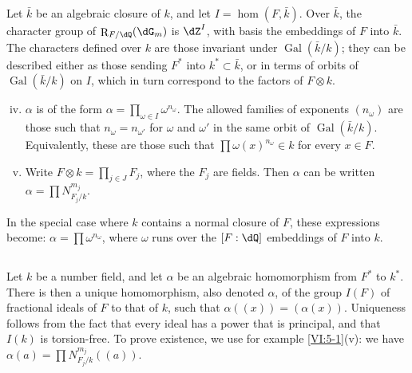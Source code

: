 \documentclass[oneside]{book}
\DeclareMathOperator{\gal}{Gal}
\DeclareMathOperator{\res}{R} %
\newcounter{char}
\theoremstyle{sga-source}
\theoremstyle{sga-source-dash}
\theoremstyle{sga-source-dotdash}
\theoremstyle{sga-source-number-note-dash}
\theoremstyle{sga-source-note-number-dotdash}
\theoremstyle{sga-source-example-dotdash}
\theoremstyle{sga-source-inline-number}
\theoremstyle{sga-source-bare-number}
\theoremstyle{sga-source}
\newcommand{\PrintPage}[1]{}\newcommand{\MathPage}[1]{}\newcommand{\PrintCite}[2]{#1}\newcommand{\var}[3]{#2}
\begin{document}
Let $\bar k$ be an algebraic closure of $k$, and let $I=\hom(F,\bar k)$. Over 
$\bar k$, the character group of $\res_{F/\dQ}(\dG_m)$ is $\dZ^I$, with basis 
the embeddings of $F$ into $\bar k$. The characters defined over $k$ 
are those invariant under $\gal(\bar k/k)$; they can be described either as 
those sending $F^\ast$ into $k^\ast\subset \bar k$, or in terms of 
orbits of $\gal(\bar k/k)$ on $I$, which in turn correspond to the factors of 
$F\otimes k$. 
\begin{enumerate}[(i)]
\setcounter{enumi}{3}
  \item $\alpha$ is of the form 
    $\alpha=\prod_{\omega\in I} \omega^{n_\omega}$. The allowed families of exponents 
    $(n_\omega)$ are those such that $n_\omega=n_{\omega'}$ for 
    $\omega$ and $\omega'$ in the same orbit of $\gal(\bar k/k)$. Equivalently, these 
    are those such that $\prod \omega(x)^{n_\omega}\in k$ for every 
    $x\in F$. 
  \PrintPage{209}
\item Write $F\otimes k=\prod_{j\in J} F_j$, where the $F_j$ are fields. 
    Then $\alpha$ can be written $\alpha=\prod N_{F_j/k}^{m_j}$. 
\end{enumerate}

In the special case where $k$ contains a normal closure of $F$, these 
expressions become: $\alpha=\prod \omega^{n_\omega}$, where $\omega$ 
runs over the $[F:\dQ]$ embeddings of $F$ into $k$. 





\subsection{}\label{VI:5-2}

Let $k$ be a number field, and let $\alpha$ be an algebraic homomorphism 
from $F^\ast$ to $k^\ast$. There is then a unique 
homomorphism, also denoted $\alpha$, of the group $I(F)$ 
of fractional ideals of $F$ to that of $k$, such that $\alpha((x))=(\alpha(x))$. 
Uniqueness follows from the fact that every ideal has a power that is 
principal, and that $I(k)$ is torsion-free. To prove 
existence, we use for example \ref{VI:5-1}(v): we have 
$\alpha(a) = \prod N_{F_j/k}^{m_j}((a))$. 





\subsection{}\label{VI:5-3}
\end{document}
